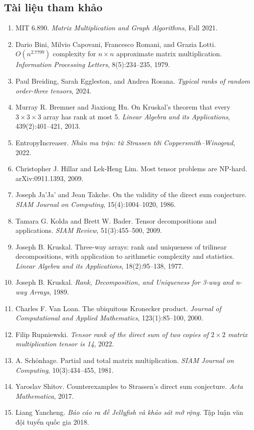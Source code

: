 \documentclass[11pt]{article}
\begin{document}
\subsection*{Tài liệu tham khảo}

\begin{enumerate}
  \item MIT 6.890. \emph{Matrix Multiplication and Graph Algorithms}, Fall
  2021.
  \item Dario Bini, Milvio Capovani, Francesco Romani, and Grazia Lotti.
  \(O(n^{2.7799})\) complexity for \(n\times n\) approximate matrix
  multiplication. \emph{Information Processing Letters}, 8(5):234--235, 1979.
  \item Paul Breiding, Sarah Eggleston, and Andrea Rosana. \emph{Typical ranks
  of random order-three tensors}, 2024.
  \item Murray R. Bremner and Jiaxiong Hu. On Kruskal's theorem that every
  \(3\times 3\times 3\) array has rank at most 5. \emph{Linear Algebra and its
  Applications}, 439(2):401--421, 2013.
  \item EntropyIncreaser. \emph{Nhân ma trận: từ Strassen tới
  Coppersmith--Winograd}, 2022.
  \item Christopher J. Hillar and Lek-Heng Lim. Most tensor problems are
  NP-hard. arXiv:0911.1393, 2009.
  \item Joseph Ja'Ja' and Jean Takche. On the validity of the direct sum
  conjecture. \emph{SIAM Journal on Computing}, 15(4):1004--1020, 1986.
  \item Tamara G. Kolda and Brett W. Bader. Tensor decompositions and
  applications. \emph{SIAM Review}, 51(3):455--500, 2009.
  \item Joseph B. Kruskal. Three-way arrays: rank and uniqueness of trilinear
  decompositions, with application to arithmetic complexity and statistics.
  \emph{Linear Algebra and its Applications}, 18(2):95--138, 1977.
  \item Joseph B. Kruskal. \emph{Rank, Decomposition, and Uniqueness for
  3-way and n-way Arrays}, 1989.
  \item Charles F. Van Loan. The ubiquitous Kronecker product. \emph{Journal of
  Computational and Applied Mathematics}, 123(1):85--100, 2000.
  \item Filip Rupniewski. \emph{Tensor rank of the direct sum of two copies of
  \(2\times 2\) matrix multiplication tensor is 14}, 2022.
  \item A. Schönhage. Partial and total matrix multiplication. \emph{SIAM
  Journal on Computing}, 10(3):434--455, 1981.
  \item Yaroslav Shitov. Counterexamples to Strassen's direct sum conjecture.
  \emph{Acta Mathematica}, 2017.
  \item Liang Yancheng. \emph{Báo cáo ra đề Jellyfish và khảo sát mở rộng}.
  Tập luận văn đội tuyển quốc gia 2018.
\end{enumerate}
\end{document}
